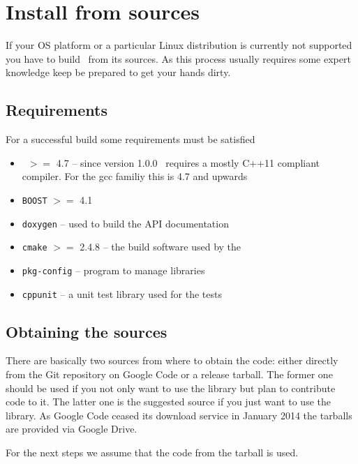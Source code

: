 \section{Install from sources}

If your OS platform or a particular Linux distribution is currently not
supported you have to build \libpnicore\ from its sources. As this process
usually requires some expert knowledge keep be prepared to get your hands dirty.

\subsection{Requirements}

For a successful build some requirements must be satisfied 
\begin{itemize} 
\item \gcc\ $>=$ 4.7 -- since version 1.0.0 \libpnicore\ requires a mostly C++11
compliant compiler. For the gcc familiy this is 4.7 and upwards 
\item \texttt{BOOST} \cite{web:boostsite} $>=$ 4.1 
\item \texttt{doxygen} \cite{web:doxygen} -- used to build the API documentation 
\item \texttt{cmake} \cite{web:cmake} $>=$ 2.4.8 -- the build software used by the \libpnicore
\item \texttt{pkg-config} \cite{web:pkgconfig} -- program to manage libraries
\item \texttt{cppunit} \cite{web:cppunit} -- a unit test library used for the tests
\end{itemize}

\subsection{Obtaining the sources}

There are basically two sources from where to obtain the code: either directly
from the Git repository on Google Code or a release tarball. The former one
should be used if you not only want to use the library but plan to contribute
code to it. The latter one is the suggested source if you just want to use the
library. 
As Google Code ceased its download service in January 2014 the tarballs are
provided via Google Drive. 

For the next steps we assume that the code from the tarball is used. 

